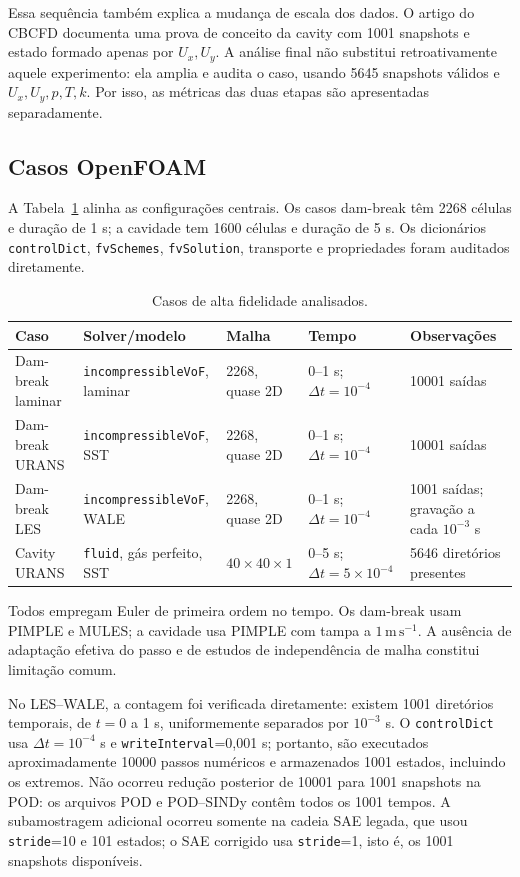 \documentclass[12pt,a4paper]{article}
\begin{document}
Essa sequência também explica a mudança de escala dos dados. O artigo do CBCFD documenta uma prova de conceito da cavity com 1001 snapshots e estado formado apenas por $U_x,U_y$. A análise final não substitui retroativamente aquele experimento: ela amplia e audita o caso, usando 5645 snapshots válidos e $U_x,U_y,p,T,k$. Por isso, as métricas das duas etapas são apresentadas separadamente.

\subsection{Casos OpenFOAM}
A Tabela~\ref{tab:casos} alinha as configurações centrais. Os casos dam-break têm 2268 células e duração de 1 s; a cavidade tem 1600 células e duração de 5 s. Os dicionários \texttt{controlDict}, \texttt{fvSchemes}, \texttt{fvSolution}, transporte e propriedades foram auditados diretamente.

\begin{table}[H]\centering\caption{Casos de alta fidelidade analisados.}\label{tab:casos}\scriptsize
\begin{tabularx}{\textwidth}{lXXXX}\toprule
Caso&Solver/modelo&Malha&Tempo&Observações\\\midrule
Dam-break laminar&\texttt{incompressibleVoF}, laminar&2268, quase 2D&0--1 s; $\Delta t=10^{-4}$&10001 saídas\\
Dam-break URANS&\texttt{incompressibleVoF}, SST&2268, quase 2D&0--1 s; $\Delta t=10^{-4}$&10001 saídas\\
Dam-break LES&\texttt{incompressibleVoF}, WALE&2268, quase 2D&0--1 s; $\Delta t=10^{-4}$&1001 saídas; gravação a cada $10^{-3}$ s\\
Cavity URANS&\texttt{fluid}, gás perfeito, SST&$40\times40\times1$&0--5 s; $\Delta t=5\times10^{-4}$&5646 diretórios presentes\\\bottomrule
\end{tabularx}\end{table}

Todos empregam Euler de primeira ordem no tempo. Os dam-break usam PIMPLE e MULES; a cavidade usa PIMPLE com tampa a $1\,\mathrm{m\,s^{-1}}$. A ausência de adaptação efetiva do passo e de estudos de independência de malha constitui limitação comum.

No LES--WALE, a contagem foi verificada diretamente: existem 1001 diretórios temporais, de $t=0$ a 1 s, uniformemente separados por $10^{-3}$ s. O \texttt{controlDict} usa $\Delta t=10^{-4}$ s e \texttt{writeInterval}=0,001 s; portanto, são executados aproximadamente 10000 passos numéricos e armazenados 1001 estados, incluindo os extremos. Não ocorreu redução posterior de 10001 para 1001 snapshots na POD: os arquivos POD e POD--SINDy contêm todos os 1001 tempos. A subamostragem adicional ocorreu somente na cadeia SAE legada, que usou \texttt{stride}=10 e 101 estados; o SAE corrigido usa \texttt{stride}=1, isto é, os 1001 snapshots disponíveis.
\end{document}
